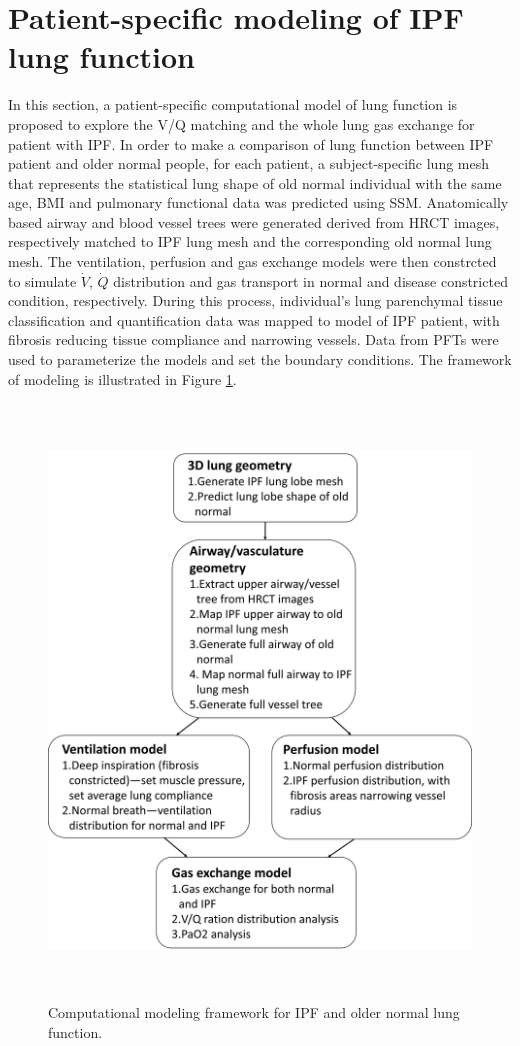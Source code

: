 \section{Patient-specific modeling of IPF lung function}
In this section, a patient-specific computational model of lung function is proposed to explore the V/Q matching and the whole lung gas exchange for patient with IPF. In order to make a comparison of lung function between IPF patient and older normal people, for each patient, a subject-specific lung mesh that represents the statistical lung shape of old normal individual with the same age, BMI and pulmonary functional data was predicted using SSM. Anatomically based airway and blood vessel trees were generated derived from HRCT images, respectively matched to IPF lung mesh and the corresponding old normal lung mesh. The ventilation, perfusion and gas exchange models were then constrcted to simulate $\dot{V}$, $\dot{Q}$ distribution and gas transport in normal and disease constricted condition, respectively. During this process, individual's lung parenchymal tissue classification and quantification data was mapped to model of IPF patient, with fibrosis reducing tissue compliance and narrowing vessels. Data from PFTs were used to parameterize the models and set the boundary conditions. The framework of modeling is illustrated in Figure \ref{fig:WholeFramework}. 

\begin{figure}[htbp]
  \centering 
  \includegraphics[height=6.2in]{ModelBasedAnalysis/Image/WholeFramework.png}
  \caption{Computational modeling framework for IPF and older normal lung function. }
  \label{fig:WholeFramework}
\end{figure}

